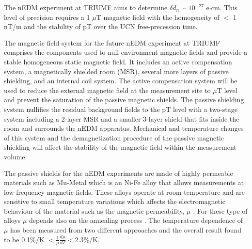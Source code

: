 \documentclass[review]{elsarticle}
\begin{document}
The nEDM experiment at TRIUMF aims to determine $\delta d_n \sim
10^{-27}$ e$\cdot$cm. This level of precision requires a 1 $\mu$T
magnetic field with the homogeneity of $<$ 1 nT/m and the stability of
pT over the UCN free-precession time.

% 
%

The magnetic field system for the future nEDM experiment at TRIUMF comprises the components used to null environment magnetic fields and provide a stable homogeneous static magnetic field. It includes an active compensation system, a magnetically shielded room (MSR), several more layers of passive shielding, and  an internal coil system.
The active compensation system will be used to reduce the external magnetic field at the measurement site to $\mu$T level and prevent the saturation of the passive magnetic shields.
The passive shielding system nullifies the residual background fields to the pT level with a two-stage system including a 2-layer MSR and a smaller 3-layer shield that fits inside the room and surrounds the nEDM apparatus.
Mechanical and temperature changes of this system and the
demagnetization procedure of the passive magnetic shielding will
affect the stability of the magnetic field within the measurement
volume\cite{bib:thiel,bib:altarev2014,bib:altarev2015,bib:voigt}.

%
%

%
%

%
%


The passive shields for the nEDM experiments are made of highly
permeable materials such as Mu-Metal which is an Ni-Fe alloy that
allows measurements at low frequency magnetic fields. These alloys
operate at room temperature and are sensitive to small temperature
variations which affects the electromagnetic behaviour of the material
such as the magnetic permeability, $\mu$ \cite{bib:couderchon,bib:kruppvdm}. For
these type of alloys $\mu$ depends also on the annealing process
\cite{bib:gupta,bib:bozorth}. The temperature dependence of $\mu$ has been
measured from two different approaches and the overall result found to
be 0.1\%/K $<\frac{1}{\mu} \frac{d\mu}{dT}<$2.3\%/K.
\end{document}
